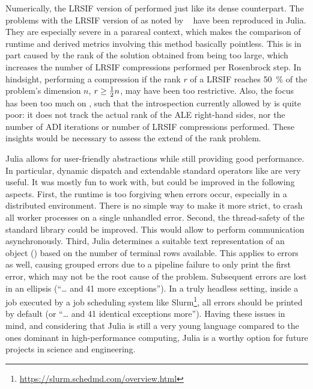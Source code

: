Numerically, the \ac{LRSIF} version of  performed just like its dense counterpart.
The problems with the \ac{LRSIF} version of  as noted by \citeauthor*{Lang2015}~\cite{Lang2015,Lang2017} have been reproduced in Julia.
They are especially severe in a parareal context,
which makes the comparison of runtime and derived metrics involving this method basically pointless.
This is in part caused by the rank of the solution obtained from  being too large,
which increases the number of \ac{LRSIF} compressions performed per Rosenbrock step.
In hindsight, performing a compression if the rank $r$ of a \ac{LRSIF} reaches \SI{50}{\percent} of the problem's dimension $n$,
\ie $r \geq \tfrac{1}{2} n$,
may have been too restrictive.
Also, the focus has been too much on ,
such that the introspection currently allowed by  is quite poor:
it does not track the actual rank of the \ac{ALE} right-hand sides,
nor the number of \ac{ADI} iterations or number of \ac{LRSIF} compressions performed.
These insights would be necessary to assess the extend of the rank problem.

Julia allows for user-friendly abstractions while still providing good performance.
In particular, dynamic dispatch and extendable standard operators like \julia{(+)} are very useful.
It was mostly fun to work with, but could be improved in the following aspects.
First, the runtime is too forgiving when errors occur,
especially in a distributed environment.
There is no simple way to make it more strict, \eg to crash all worker processes on a single unhandled error.
Second, the thread-safety of the standard library could be improved.
This would allow  to perform communication asynchronously.
Third, Julia determines a suitable text representation of an object (\eg {}) based on the number of terminal rows available.
This applies to errors as well, causing \eg grouped errors due to a pipeline failure to only print the first error,
which may not be the root cause of the problem.
Subsequent errors are lost in an ellipsis (\enquote{\ldots{} and 41 more exceptions}).
In a truly headless setting,
\eg inside a job executed by a job scheduling system like Slurm\footnote{\url{https://slurm.schedmd.com/overview.html}},
all errors should be printed by default (or \enquote{\ldots{} and 41 identical exceptions more}).
Having these issues in mind,
and considering that Julia is still a very young language compared to the ones dominant in high-performance computing,
Julia is a worthy option for future projects in science and engineering.

